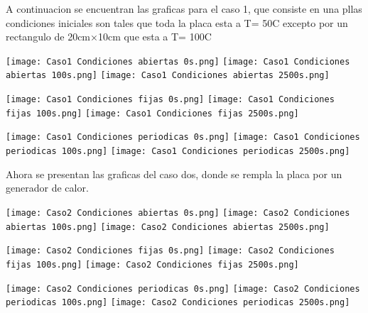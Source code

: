 \documentclass{article}
\begin{document}
A continuacion se encuentran las graficas para el caso 1, que consiste en una pllas condiciones iniciales son tales que toda la placa esta a T= 50C excepto por un rectangulo de 20cm×10cm que esta a T= 100C
\begin{center} 
\texttt{[image: Caso1 Condiciones abiertas 0s.png]} 
\vspace{0.5cm}
\texttt{[image: Caso1 Condiciones abiertas 100s.png]} 
\vspace{0.5cm}
\texttt{[image: Caso1 Condiciones abiertas 2500s.png]} 
\vspace{0.5cm}

\texttt{[image: Caso1 Condiciones fijas 0s.png]} 
\vspace{0.5cm}
\texttt{[image: Caso1 Condiciones fijas 100s.png]} 
\vspace{0.5cm}
\texttt{[image: Caso1 Condiciones fijas 2500s.png]} 
\vspace{0.5cm}

\texttt{[image: Caso1 Condiciones periodicas 0s.png]} 
\vspace{0.5cm}
\texttt{[image: Caso1 Condiciones periodicas 100s.png]} 
\vspace{0.5cm}
\texttt{[image: Caso1 Condiciones periodicas 2500s.png]} 
\vspace{0.5cm}
\end{center}

Ahora se presentan las graficas del caso dos, donde se rempla la placa por un generador de calor.

\begin{center} 
\texttt{[image: Caso2 Condiciones abiertas 0s.png]} 
\vspace{0.5cm}
\texttt{[image: Caso2 Condiciones abiertas 100s.png]} 
\vspace{0.5cm}
\texttt{[image: Caso2 Condiciones abiertas 2500s.png]} 
\vspace{0.5cm}

\texttt{[image: Caso2 Condiciones fijas 0s.png]} 
\vspace{0.5cm}
\texttt{[image: Caso2 Condiciones fijas 100s.png]} 
\vspace{0.5cm}
\texttt{[image: Caso2 Condiciones fijas 2500s.png]} 
\vspace{0.5cm}

\texttt{[image: Caso2 Condiciones periodicas 0s.png]} 
\vspace{0.5cm}
\texttt{[image: Caso2 Condiciones periodicas 100s.png]} 
\vspace{0.5cm}
\texttt{[image: Caso2 Condiciones periodicas 2500s.png]} 
\vspace{0.5cm}
\end{center}
\end{document}

